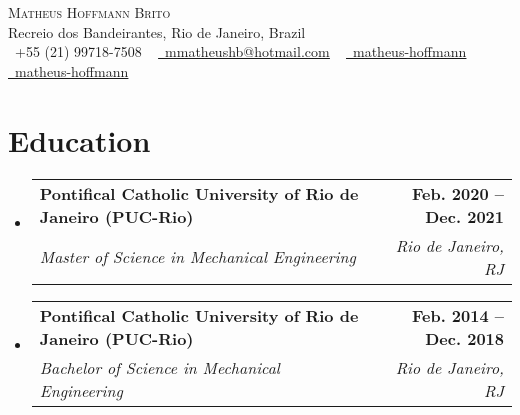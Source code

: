 \documentclass[letterpaper,11pt]{article}
\makeatletter
\newcommand{\resumeSubheading}[4]{
  \vspace{-2pt}\item
    \begin{tabular*}{1.0\textwidth}[t]{l@{\extracolsep{\fill}}r}
      \textbf{#1} & \textbf{\small #2} \\
      \textit{\small#3} & \textit{\small #4} \\
    \end{tabular*}\vspace{-7pt}
}
\newcommand{\resumeSubHeadingListStart}{\begin{itemize}[leftmargin=0.0in, label={}]}
\newcommand{\resumeSubHeadingListEnd}{\end{itemize}}
\makeatother
\begin{document}

\begin{center}
    {\Huge \scshape Matheus Hoffmann Brito} \\ \vspace{1pt}
    Recreio dos Bandeirantes, Rio de Janeiro, Brazil \\ \vspace{1pt}
    \small \raisebox{-0.1\height}\faPhone\ +55 (21) 99718-7508 ~ \href{mailto:x@gmail.com}{\raisebox{-0.2\height}\faEnvelope\  \underline{mmatheushb@hotmail.com}} ~ 
    \href{https://linkedin.com/in/matheus-hoffmann}{\raisebox{-0.2\height}\faLinkedin\ \underline{matheus-hoffmann}}  ~
    \href{https://github.com/matheus-hoffmann}{\raisebox{-0.2\height}\faGithub\ \underline{matheus-hoffmann}}
    \vspace{-8pt}
\end{center}


\section{Education}
\resumeSubHeadingListStart
\resumeSubheading
{Pontifical Catholic University of Rio de Janeiro (PUC-Rio)}{Feb. 2020 -- Dec. 2021}
{Master of Science in Mechanical Engineering}{Rio de Janeiro, RJ}
\resumeSubheading
{Pontifical Catholic University of Rio de Janeiro (PUC-Rio)}{Feb. 2014 -- Dec. 2018}
{Bachelor of Science in Mechanical Engineering}{Rio de Janeiro, RJ}
\resumeSubHeadingListEnd


\end{document}
